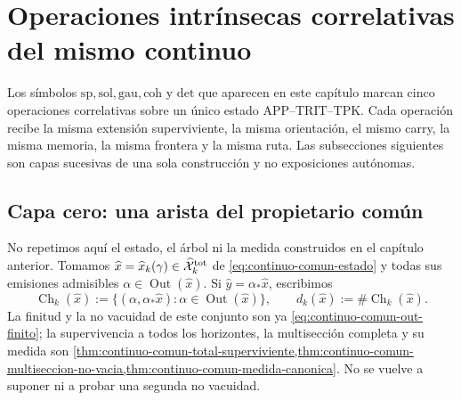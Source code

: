 \chapter{Operaciones intrínsecas correlativas del mismo continuo}
\label{chap:pdfv2-operaciones-intrinsecas-correlativas}

\begin{thesisbox}
Los símbolos \(\mathrm{sp},\mathrm{sol},\mathrm{gau},\mathrm{coh}\) y
\(\mathrm{det}\) que aparecen en este capítulo marcan cinco operaciones
correlativas sobre un único estado APP--TRIT--TPK\@. Cada operación recibe
la misma extensión superviviente, la
misma orientación, el mismo carry, la misma memoria, la misma frontera y la
misma ruta. Las subsecciones siguientes son capas sucesivas de una sola
construcción y no exposiciones autónomas.
\end{thesisbox}

\section{Capa cero: una arista del propietario común}

No repetimos aquí el estado, el árbol ni la medida construidos en el capítulo
anterior. Tomamos
\(\widehat x=\widehat x_k(\gamma)\in
\widehat{\mathcal X}^{\rm tot}_k\) de
\eqref{eq:continuo-comun-estado} y todas sus emisiones admisibles
\(\alpha\in\operatorname{Out}(\widehat x)\). Si
\(\widehat y=\alpha_*\widehat x\), escribimos
\begin{equation}
\label{eq:pdfv2-cor-hijos-supervivientes}
 \operatorname{Ch}_k(\widehat x):=
 \{(\alpha,\alpha_*\widehat x):
      \alpha\in\operatorname{Out}(\widehat x)\},
 \qquad
 d_k(\widehat x):=\#\operatorname{Ch}_k(\widehat x).
\end{equation}
La finitud y la no vacuidad de este conjunto son ya
\eqref{eq:continuo-comun-out-finito}; la supervivencia a todos los horizontes,
la multisección completa y su medida son
\cref{thm:continuo-comun-total-superviviente,thm:continuo-comun-multiseccion-no-vacia,thm:continuo-comun-medida-canonica}. No se vuelve a suponer ni a probar una
segunda no vacuidad.

